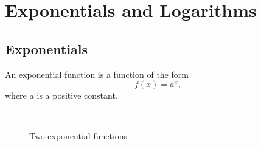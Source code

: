 \chapter{Exponentials and Logarithms}
\section{Exponentials}
 An exponential function is a function of the form
 \[f(x)=a^{x},\]
 where $a$ is a positive constant.
 
\begin{example}
\begin{figure}[H]
    \hspace{0.2cm}
    \hspace{2.0cm}
     \\
    \centering
  \caption{Two exponential functions}
  \label{fig:eponential-examples}
\end{figure}
\end{example}

